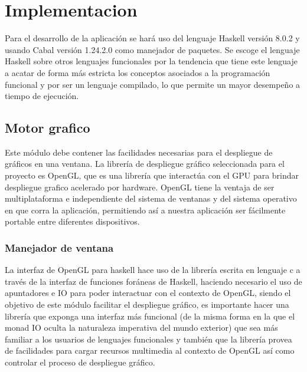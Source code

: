 
\setcounter{secnumdepth}{4}

\chapter{Implementacion}  %

\graphicspath{{implementacion/Figs/Vector/}{implementacion/Figs/}}

Para el desarrollo de la aplicación se hará uso del lenguaje Haskell versión 8.0.2 y usando Cabal versión 1.24.2.0 como manejador de paquetes. Se escoge el lenguaje Haskell sobre otros lenguajes funcionales por la tendencia que tiene este lenguaje a acatar de forma más estricta los conceptos asociados a la programación funcional y por ser un lenguaje compilado, lo que permite un mayor desempeño a tiempo de ejecución.

\section{Motor grafico}

Este módulo debe contener las facilidades necesarias para el despliegue de gráficos en una ventana. La librería de despliegue gráfico seleccionada para el proyecto es OpenGL, que es una librería que interactúa con el GPU para brindar despliegue grafico acelerado por hardware. OpenGL tiene la ventaja de ser multiplataforma e independiente del sistema de ventanas y del sistema operativo en que corra la aplicación, permitiendo así a nuestra aplicación ser fácilmente portable entre diferentes dispositivos.

\subsection{Manejador de ventana}

La interfaz de OpenGL para haskell hace uso de la librería escrita en lenguaje c a través de la interfaz de funciones foráneas de Haskell, haciendo necesario el uso de apuntadores e IO para poder interactuar con el contexto de OpenGL, siendo el objetivo de este módulo facilitar el despliegue gráfico, es importante hacer una librería que exponga una interfaz más funcional (de la misma forma en la que el monad IO oculta la naturaleza imperativa del mundo exterior) que sea más familiar a los usuarios de lenguajes funcionales y también que la librería provea de facilidades para cargar recursos multimedia al contexto de OpenGL así como controlar el proceso de despliegue gráfico.

